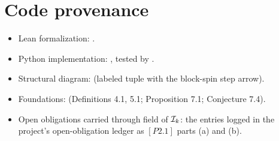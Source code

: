 \section{Code provenance}
\label{sec:inductive-state-codeanchor}

\begin{itemize}
  \item Lean formalization:
    .
  \item Python implementation: ,
    tested by .
  \item Structural diagram:
    (labeled tuple with the block-spin step arrow).
  \item Foundations:  (Definitions 4.1,
    5.1; Proposition 7.1; Conjecture 7.4).
  \item Open obligations carried through field 
    of $\mathcal{I}_k$: the entries logged in the project's
    open-obligation ledger as $[P2.1]$ parts (a) and (b).
\end{itemize}
